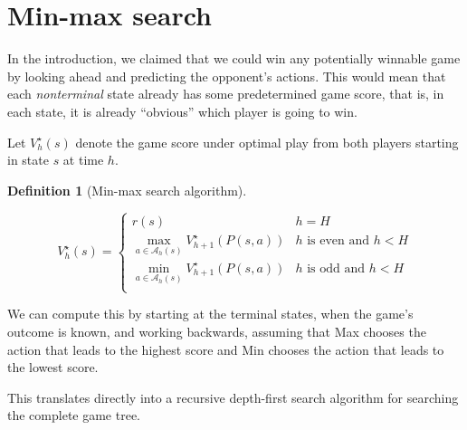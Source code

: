 \documentclass[
  letterpaper,
  DIV=11,
  numbers=noendperiod]{scrreprt}
\theoremstyle{plain}
\theoremstyle{plain}
\theoremstyle{definition}
\theoremstyle{definition}
\newtheorem{definition}{Definition}[chapter]
\theoremstyle{remark}
\begin{document}
\section{Min-max search}\label{sec-min-max-search}

In the introduction, we claimed that we could win any potentially
winnable game by looking ahead and predicting the opponent's actions.
This would mean that each \emph{nonterminal} state already has some
predetermined game score, that is, in each state, it is already
``obvious'' which player is going to win.

Let \(V_h^\star(s)\) denote the game score under optimal play from both
players starting in state \(s\) at time \(h\).

\begin{definition}[Min-max search
algorithm]\protect\hypertarget{def-min-max-value}{}\label{def-min-max-value}

\[
V_h^{\star}(s) = \begin{cases}
r(s) & h= H\\
\max_{a \in \mathcal{A}_h(s)} V_{h+1}^{\star}(P(s, a)) & h\text{ is even and } h< H \\
\min_{a \in \mathcal{A}_h(s)} V_{h+1}^{\star}(P(s, a)) & h\text{ is odd and } h< H \\
\end{cases}
\]

\end{definition}

We can compute this by starting at the terminal states, when the game's
outcome is known, and working backwards, assuming that Max chooses the
action that leads to the highest score and Min chooses the action that
leads to the lowest score.

This translates directly into a recursive depth-first search algorithm
for searching the complete game tree.
\end{document}
